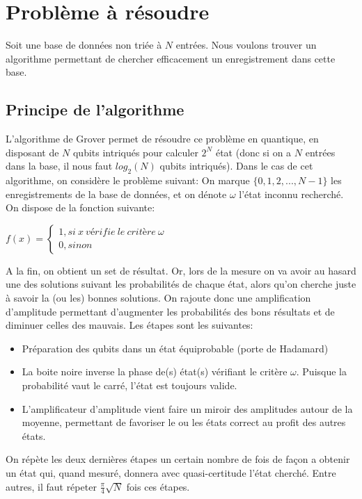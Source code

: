 \documentclass[a4paper]{article}
\begin{document}
\maketitle

\section{Problème à résoudre}
Soit une base de données non triée à $N$ entrées. Nous voulons trouver un algorithme permettant de chercher efficacement un enregistrement dans cette base.

\subsection{Principe de l'algorithme}
L'algorithme de Grover permet de résoudre ce problème en quantique, en disposant de $N$ qubits intriqués pour calculer $2^N$ état 
(donc si on a $N$ entrées dans la base, il nous faut $log_2(N)$ qubits intriqués). Dans le cas de cet algorithme, on considère le problème suivant:
\medbreak
On marque $\{0, 1, 2, ..., N-1\}$ les enregistrements de la base de données, et on dénote $\omega$ l'état inconnu recherché. On dispose de la fonction suivante:

$f(x) = 
 \begin{cases}
   1, si\ x\ vérifie\ le\ critère\ \omega \\
   0, sinon
 \end{cases}
$

A la fin, on obtient un set de résultat. Or, lors de la mesure on va avoir au hasard une des solutions suivant les probabilités de chaque état, alors qu'on cherche
juste à savoir la (ou les) bonnes solutions. On rajoute donc une amplification d'amplitude permettant d'augmenter les probabilités des bons résultats et de diminuer
celles des mauvais.
\medbreak
Les étapes sont les suivantes:
\begin{itemize}
  \item Préparation des qubits dans un état équiprobable (porte de Hadamard)
  \item La boite noire inverse la phase de(s) état(s) vérifiant le critère $\omega$. Puisque la probabilité vaut le carré, l'état est toujours valide.
  \item L'amplificateur d'amplitude vient faire un miroir des amplitudes autour de la moyenne, permettant de favoriser le ou les états correct au profit des autres états.
\end{itemize}

On répète les deux dernières étapes un certain nombre de fois de façon a obtenir un état qui, quand mesuré, donnera avec quasi-certitude l'état cherché. Entre autres, il
faut répeter $\frac{\pi}{4}\sqrt{N}$ fois ces étapes.
\end{document}
